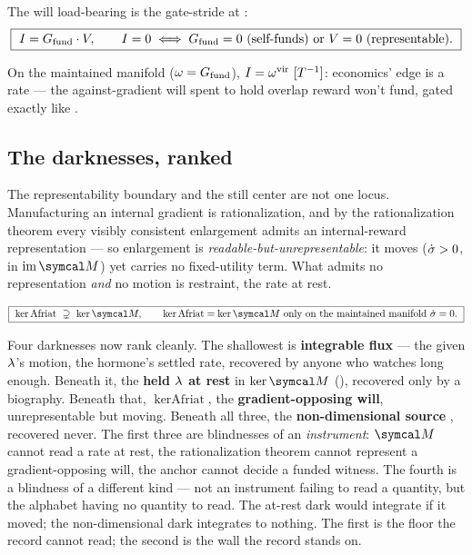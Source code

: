 \documentclass[../main]{subfiles}
\begin{document}
\begin{definition}
  The will load-bearing is the gate-stride  at :
  \begin{equation}
    \boxed{\ \edgeload=\fundinggap\cdot\nonreprfrac,\qquad \edgeload=0\iff \fundinggap=0\ (\text{self-funds})\ \text{or}\ \nonreprfrac=0\
      (\text{representable}).\ }
    \label{eq:bd:edge}
  \end{equation}
\end{definition}

On the maintained manifold ($\omega=G\sb{\mathrm{fund}}$), $I=\omega\sp{\mathrm{vir}}\ [T\sp{-1}]$: economics' edge is a rate
--- the against-gradient will spent to hold overlap reward won't fund, gated exactly like
\ftag{f:acc}.

\subsection{The darknesses, ranked}
\label{subsec:bd:darknesses}
%
The representability boundary and the still center are not one locus. Manufacturing an
internal gradient is rationalization, and by the rationalization theorem every visibly
consistent enlargement admits an internal-reward representation --- so enlargement is
\emph{readable-but-unrepresentable}: it moves ($\dot{\sigma}>0$, in $\mathrm{im}\,\readout$) yet
carries no fixed-utility term. What admits no representation \emph{and} no motion is
restraint, the rate at rest.

\begin{definition}[\hdr{op:afriat}]
  \begin{equation}
    \boxed{\ \ker\text{Afriat}\ \supsetneq\ \ker\readout,\qquad
      \ker\text{Afriat}=\ker\readout\ \text{only on the maintained manifold }\alignrate=0.\ }
    \label{eq:op:afriat}
  \end{equation}
\end{definition}

Four darknesses now rank cleanly. The shallowest is \textbf{integrable flux} --- the given
$\lambda$'s motion, the hormone's settled rate, recovered by anyone who watches long
enough. Beneath it, the \textbf{held $\lambda$ at rest} in $\ker\readout$
(\ftag{ten:self}), recovered only by a biography. Beneath that, $\ker\text{Afriat}$, the
\textbf{gradient-opposing will}, unrepresentable but moving. Beneath all three, the
\textbf{non-dimensional source} \ftag{src:nd}, recovered never. The first three are blindnesses
of an \emph{instrument}: $\readout$ cannot read a rate at rest, the rationalization theorem
cannot represent a gradient-opposing will, the anchor cannot decide a funded witness. The
fourth is a blindness of a different kind --- not an instrument failing to read a quantity,
but the alphabet \ftag{gen:alph} having no quantity to read. The at-rest dark would integrate if
it moved; the non-dimensional dark integrates to nothing. The first is the floor the record
cannot read; the second is the wall the record stands on.
\end{document}
